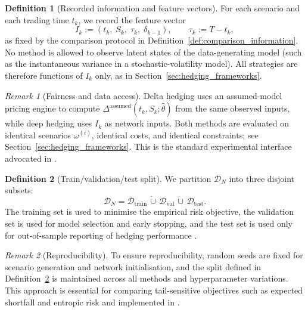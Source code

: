 \documentclass[12pt,a4paper]{article}
\theoremstyle{definition}
\newtheorem{definition}{Definition}[section]
\theoremstyle{plain}
\theoremstyle{remark}
\newtheorem{remark}{Remark}[section]
\theoremstyle{plain}
\begin{document}
\begin{definition}[Recorded information and feature vectors]
\label{def:recorded_features}
For each scenario and each trading time $t_k$, we record the feature vector
\[
I_k := (t_k,\; S_k,\; \tau_k,\; \delta_{k-1}), \qquad \tau_k := T-t_k,
\]
as fixed by the comparison protocol in Definition~\ref{def:comparison_information}. 
No method is allowed to observe latent states of the data-generating model (such as the instantaneous variance in a stochastic-volatility model). 
All strategies are therefore functions of $I_k$ only, as in Section~\ref{sec:hedging_frameworks}.
\end{definition}

\begin{remark}[Fairness and data access]
\label{rem:data_access}
Delta hedging uses an assumed-model pricing engine to compute $\Delta^{\mathrm{assumed}}(t_k,S_k;\hat\theta)$ from the same observed inputs, while deep hedging uses $I_k$ as network inputs. 
Both methods are evaluated on identical scenarios $\omega^{(i)}$, identical costs, and identical constraints; see Section~\ref{sec:hedging_frameworks}. 
This is the standard experimental interface advocated in \cite{Buehler2019DeepHedging}.
\end{remark}

\begin{definition}[Train/validation/test split]
\label{def:split}
We partition $\mathcal{D}_N$ into three disjoint subsets:
\[
\mathcal{D}_N = \mathcal{D}_{\mathrm{train}} \,\dot\cup\, \mathcal{D}_{\mathrm{val}} \,\dot\cup\, \mathcal{D}_{\mathrm{test}}.
\]
The training set is used to minimise the empirical risk objective, the validation set is used for model selection and early stopping, and the test set is used only for out-of-sample reporting of hedging performance \cite{Buehler2019DeepHedging,Horvath2021DeepRough}.
\end{definition}

\begin{remark}[Reproducibility]
\label{rem:reproducibility}
To ensure reproducibility, random seeds are fixed for scenario generation and network initialisation, and the split defined in Definition~\ref{def:split} is maintained across all methods and hyperparameter variations.
This approach is essential for comparing tail-sensitive objectives such as expected shortfall and entropic risk \cite{FoellmerSchied2016} and implemented in \cite{Buehler2019DeepHedging}.
\end{remark}
\end{document}
